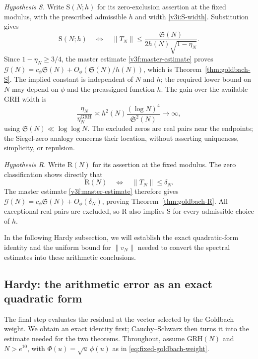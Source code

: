 \documentclass[12pt,a4paper]{amsart}
\numberwithin{equation}{section}
\def\le{\leqslant}
\def\ge{\geqslant}
\theoremstyle{plain}
\theoremstyle{definition}
\theoremstyle{remark}
\begin{document}
\emph{Hypothesis S.} Write $\mathrm S(N;h)$ for its zero-exclusion
assertion at the fixed modulus, with the prescribed admissible
$h$ and width \eqref{v3i:S-width}. Substitution gives
\begin{equation}\label{v3i:S-norm}
 \mathrm S(N;h)\quad\Longleftrightarrow\quad
 \|T_N\|\le\frac{\mathfrak S(N)}{2h(N)\sqrt{1-\eta_N}}.
\end{equation}
Since $1-\eta_N\ge3/4$, the master estimate
\eqref{v3f:master-estimate} proves
$\mathcal G(N)=c_\phi\mathfrak S(N)+O_\phi(\mathfrak S(N)/h(N))$,
which is Theorem~\ref{thm:goldbach-S}. The implied constant is
independent of $N$ and $h$; the required lower bound on $N$
may depend on $\phi$ and the preassigned function $h$. The gain over the available
GRH width is
\begin{equation}\label{outline:S-gap}
 \frac{\eta_N}{\eta_N^{\mathrm{GRH}}}
 \asymp h^2(N)\frac{(\log N)^4}{\mathfrak S^2(N)}\longrightarrow\infty,
\end{equation}
using $\mathfrak S(N)\ll\log\log N$.
The excluded zeros are real pairs near the endpoints; the
Siegel-zero analogy concerns their location, without asserting
uniqueness, simplicity, or repulsion.

\emph{Hypothesis R.} Write $\mathrm R(N)$ for its assertion
at the fixed modulus. The zero classification shows directly that
\begin{equation}\label{v3i:R-equivalence}
 \mathrm R(N)\quad\Longleftrightarrow\quad\|T_N\|\le\delta_N.
\end{equation}
The master estimate \eqref{v3f:master-estimate} therefore gives
$\mathcal G(N)=c_\phi\mathfrak S(N)+O_\phi(\delta_N)$,
proving Theorem~\ref{thm:goldbach-R}. All exceptional real pairs
are excluded, so R also implies S for every admissible choice of
$h$.

In the following Hardy subsection, we will establish the
exact quadratic-form identity and the uniform bound for $\|v_N\|$
needed to convert the spectral estimates into these arithmetic conclusions.

\subsection{Hardy: the arithmetic error as an exact quadratic form}
\label{story:hardy}

The final step evaluates the residual at the vector selected by the
Goldbach weight. We obtain an exact identity first; Cauchy--Schwarz
then turns it into the estimate needed for the two theorems.
Throughout, assume $\mathrm{GRH}(N)$ and $N>e^{10}$, with
$\Phi(u)=\sqrt u\,\phi(u)$ as in \eqref{eq:fixed-goldbach-weight}.
\end{document}
